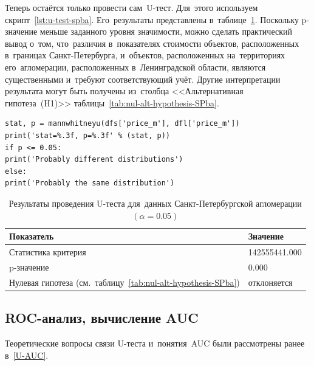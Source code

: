 \documentclass[]{scrreprt}
\begin{document}
Теперь остаётся только провести сам~U-тест. Для~этого используем скрипт~\ref{lst:u-test-spba}. Его~результаты представлены в~таблице~\ref{tab:u-test-py-result}. Поскольку p-значение меньше заданного уровня значимости, можно сделать практический вывод о~том, что~различия в~показателях стоимости объектов, расположенных в~границах Санкт-Петербурга, и~объектов, расположенных на~территориях его~агломерации, расположенных в~Ленинградской области, являются существенными и~требуют соответствующий учёт. Другие интерпретации результата могут быть получены из~столбца <<Альтернативная гипотеза~(H1)>> таблицы~\ref{tab:nul-alt-hypothesis-SPba}.
%
\begin{lstlisting}[float, caption = Проведение теста Манна"--~Уитни-Уилкоксона для~данных удельных цен предложения квартир в~агломерации Санкт-Петербурга, firstnumber=1, label= lst:u-test-spba]
stat, p = mannwhitneyu(dfs['price_m'], dfl['price_m'])
print('stat=%.3f, p=%.3f' % (stat, p))
if p <= 0.05:
print('Probably different distributions')
else:
print('Probably the same distribution')
\end{lstlisting}  
%
\begin{table}[ht]
	\caption{Результаты проведения U-теста для~данных Санкт-Петербургской агломерации $({\textstyle \alpha=0.05})$}\label{tab:u-test-py-result}
	\centering
	\begin{tabular}{ll}
		\hline
	Показатель&Значение\\
		\hline
	Статистика критерия&142555441.000\\
		\hline
	p-значение&0.000\\
		\hline
	Нулевая гипотеза (см.~таблицу~\ref{tab:nul-alt-hypothesis-SPba})&отклоняется\\
		\hline
	\end{tabular}
\end{table}

\subsection{ROC-анализ, вычисление AUC}
Теоретические вопросы связи U-теста и~понятия~AUC были рассмотрены ранее в~\ref{U-AUC}. 
\clearpage
\end{document}
